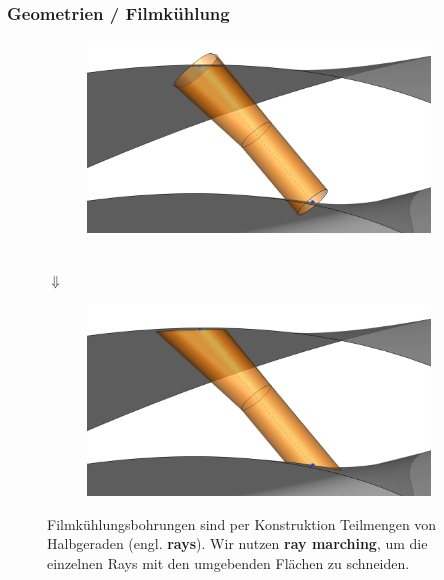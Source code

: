 \documentclass[8pt, aspectratio=169]{beamer}
\begin{document}
\begin{frame}
	\frametitle{Geometrien / Filmkühlung}
	\vspace{-0.5cm}
	\centering
	\begin{minipage}[t]{.4\textwidth}
		\begin{figure}[H]
			\centering
			\begin{subfigure}{\textwidth}
				\includegraphics[width=\textwidth]{../../tec/holes/20edit.png}
			\end{subfigure}\\
			$\Downarrow$\\
			\begin{subfigure}{\textwidth}
				\includegraphics[width=\textwidth]{../../tec/holes/21edit.png}
			\end{subfigure}
		\end{figure}
	\end{minipage}
	\begin{minipage}[t]{.55\textwidth}
		\begin{figure}[H]
			\vspace{1cm}
			\centering
			Filmkühlungsbohrungen sind per Konstruktion Teilmengen von Halbgeraden (engl. \textbf{rays}).
			Wir nutzen \textbf{ray marching}, um die einzelnen Rays mit den umgebenden Flächen zu schneiden.
			
		\end{figure}
	\end{minipage}
	\vfill
\end{frame}
\end{document}
